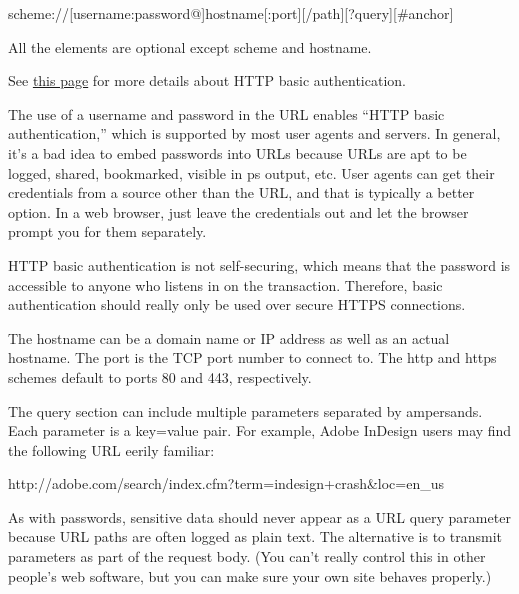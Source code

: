 {}{scheme}://{[}{username:password}@{]}{hostname}{[}:{port}{]}{[}/{path}{]}{[}?{query}{]}{[}\#{anchor}{]}

All the elements are optional except {scheme} and {hostname}.

\leavevmode\hypertarget{part0027_split_002.htmlux5cux23_idContainer1251}{}%
See
\protect\hyperlink{part0027_split_023.htmlux5cux23_idTextAnchor1257}{this
page} for more details about HTTP basic authentication.

\protect\hypertarget{part0027_split_002.htmlux5cux23_idIndexMarker2755}{}{}The
use of a {username} and {password} in the URL enables ``HTTP basic
authentication,'' which is supported by most user agents and servers. In
general, it's a bad idea to embed passwords into URLs because URLs are
apt to be logged, shared, bookmarked, visible in {ps} output, etc. User
agents can get their credentials from a source other than the URL, and
that is typically a better option. In a web browser, just leave the
credentials out and let the browser prompt you for them separately.

HTTP basic authentication is not self-securing, which means that the
password is accessible to anyone who listens in on the transaction.
Therefore, basic authentication should really only be used over secure
\protect\hypertarget{part0027_split_002.htmlux5cux23_idIndexMarker2756}{}{}HTTPS
connections.

\protect\hypertarget{part0027_split_002.htmlux5cux23_idIndexMarker2757}{}{}The
{hostname} can be a domain name or IP address as well as an actual
hostname. The {port} is the TCP port number to connect to. The http and
https schemes default to ports 80 and 443, respectively.

The {query} section can include multiple parameters separated by
ampersands. Each parameter is a {key=value} pair. For example,
\protect\hypertarget{part0027_split_002.htmlux5cux23_idIndexMarker2758}{}{}Adobe
InDesign users may find the following URL eerily familiar:

{}http://adobe.com/search/index.cfm?term=indesign+crash\&loc=en\_us

\protect\hypertarget{part0027_split_002.htmlux5cux23_idIndexMarker2759}{}{}As
with passwords, sensitive data should never appear as a URL query
parameter because URL paths are often logged as plain text. The
alternative is to transmit parameters as part of the request body. (You
can't really control this in other people's web software, but you can
make sure your own site behaves properly.)

